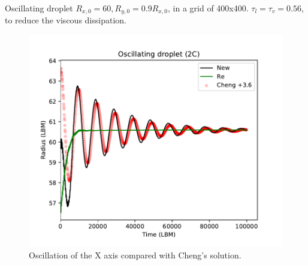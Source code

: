 \documentclass[8pt]{beamer}
\begin{document}
	\begin{frame}{Oscillating droplet}
		$R_{x,0} = 60, R_{y,0} = 0.9 R_{x,0}$, in a grid of 400x400. $\tau_l = \tau_v = 0.56$, to reduce the viscous dissipation.
		\begin{figure}[h]
			\centering
			\includegraphics[scale=0.4]{pics/2cOsc.pdf}
			\caption{Oscillation of the X axis compared with Cheng's solution.}
			\label{fig:2cOsc}
		\end{figure}
	\end{frame}
	
\end{document}

